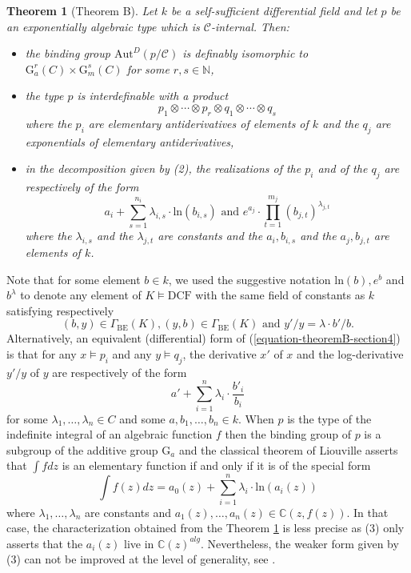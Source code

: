 \documentclass[12pt]{amsart}
\newcommand{\DCF}{\mathrm{DCF}}
\newcommand{\BE}{\mathrm{BE}}
\theoremstyle{definition}
\theoremstyle{plain}
\newtheorem{theorem}[defn]{Theorem}
\theoremstyle{exampstyle}\newtheorem{thmx}{Theorem}
\theoremstyle{exampstyle}\newtheorem{thmxbis}{Theorem}
\newcommand{\Gm}{\mathrm{G}_m}
\newcommand{\Ga}{\mathrm{G}_a}
\begin{document}
\begin{theorem}[Theorem B]\label{theoremB}
Let $k$ be a self-sufficient differential field and let $p$ be an exponentially algebraic type which is $\mathcal C$-internal. Then: 
\begin{itemize}
\item[(1)] the binding group $\mathrm{Aut}^D(p/\mathcal C)$ is definably isomorphic to $\Ga^r(C) \times \Gm^s(C)$ for some $r,s \in \mathbb{N}$,
\item[(2)] the type $p$ is interdefinable with a product $$p_1 \otimes \cdots \otimes p_r \otimes  q_1  \otimes \cdots \otimes q_s$$ where the $p_i$ are elementary antiderivatives of elements of $k$ and the $q_j$ are exponentials of elementary antiderivatives,
\item[(3)] in the decomposition given by (2), the realizations of the $p_i$ and of the $q_j$  are respectively of the form 
\begin{equation}\label{equation-theoremB-section4}  
a_i + \sum_{s = 1}^{n_i} \lambda_{i,s} \cdot  \mathrm{ln}(b_{i,s}) \text{ and } e^{a_j} \cdot  \prod_{t = 1}^{m_j} (b_{j,t})^{\lambda_{j,t}}
\end{equation}
where the $\lambda_{i,s}$ and the $\lambda_{j,t}$ are constants and the $a_i,b_{i,s}$ and the $a_j, b_{j,t}$  are elements of $k$.
\end{itemize}
\end{theorem}

Note that for some element $b \in k$, we used the suggestive notation $\mathrm{ln}(b), e^{b}$ and $b^\lambda$ to denote any element of $K\models \DCF$ with the same field of constants as $k$ satisfying respectively
$$ (b,y) \in \Gamma_\BE(K), (y,b) \in \Gamma_\BE(K) \text{ and } y'/y = \lambda \cdot b'/b.$$
Alternatively, an equivalent (differential) form of (\ref{equation-theoremB-section4}) is that for any $x \models p_i$ and any $y \models q_j$, the derivative $x'$ of $x$ and the log-derivative $y'/y$ of $y$ are respectively of the form 
$$ a' + \sum_{ i  = 1}^{n} \lambda_i \cdot \frac {b'_i}{b_{i}}$$
for some $\lambda_1,\ldots, \lambda_n \in C$ and some $a,b_1,\ldots,b_n \in k$. 
When  $p$ is the type of the indefinite integral of an algebraic function $f$ then the binding group of $p$ is a subgroup of the additive group $\Ga$ and  the classical theorem of Liouville \cite{Liouville2} asserts that $\int f dz$ is an elementary function if and only if it is of the special form 
$$ \int f(z) dz = a_0(z) + \sum_{i = 1}^n \lambda_i \cdot \mathrm{ln}(a_i(z))$$
where $\lambda_1,\ldots,\lambda_n$ are constants and $a_1(z),\ldots,a_n(z) \in \mathbb{C}(z,f(z))$. In that case, the characterization obtained from the Theorem \ref{theoremB} is less precise  as (3) only asserts that the $a_i(z)$ live in $\mathbb{C}(z)^{alg}$. Nevertheless, the weaker form given by (3) can not be improved at the level of generality, see \cite{Davenport-Singer}.
\end{document}
